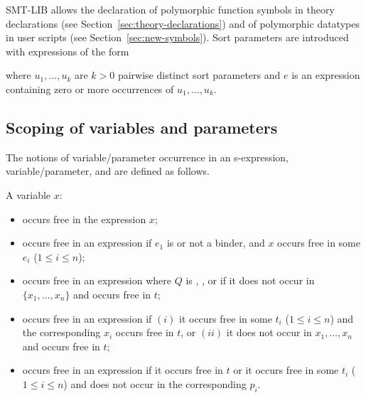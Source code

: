 SMT-LIB allows the declaration of polymorphic function symbols 
in theory declarations (see Section~\ref{sec:theory-declarations}) and 
of polymorphic datatypes in user scripts (see Section~\ref{sec:new-symbols}).
Sort parameters are introduced with expressions of the form
\begin{center}
\end{center}
where $u_1, \ldots, u_k$ are $k>0$ pairwise distinct sort parameters and
$e$ is an expression containing zero or more occurrences of $u_1, \ldots, u_k$.


\subsection{Scoping of variables and parameters} \label{sec:free}

The notions of  variable/parameter occurrence in an s-expression,
 variable/parameter, and
 are defined as follows.
\smallskip

\noindent A variable $x$:
\begin{itemize}
\item
occurs free in the expression $x$;
\item
occurs free in an expression 
if $e_1$ is  or not a binder, and 
$x$ occurs free in some $e_i$ ($1\le i\le n$); 
\item
occurs free in an expression 
where $Q$ is , , or 
if it does not occur in $\{x_1, \ldots, x_n\}$ and occurs free in $t$;
\item
occurs free in an expression 
 if 
$(i)$ it occurs free in some $t_i$ ($1\le i\le n$) and 
the corresponding $x_i$ occurs free in $t$, or 
$(ii)$ it does not occur in $x_1, \ldots, x_n$ and occurs free in $t$;
\item
occurs free in an expression
if it occurs free in $t$ or it occurs free in some $t_i$ ($1\le i\le n$) and
does not occur in the corresponding $p_i$.
\end{itemize}


